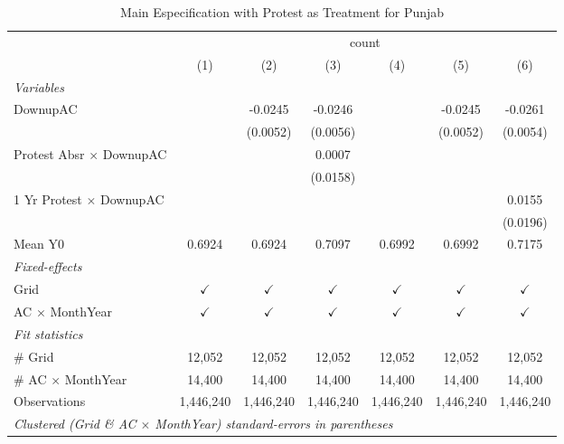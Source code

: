 
\begin{table}[htbp]
   \caption{\label{tab:protest_treat_main_pj} Main Especification with Protest as Treatment for Punjab}
   \centering
   \begin{tabular}{lcccccc}
      \tabularnewline \midrule \midrule
       & \multicolumn{6}{c}{count}\\
                                       & (1)           & (2)           & (3)           & (4)           & (5)           & (6)\\  
      \midrule
      \emph{Variables}\\
      DownupAC                         &               & -0.0245       & -0.0246       &               & -0.0245       & -0.0261\\   
                                       &               & (0.0052)      & (0.0056)      &               & (0.0052)      & (0.0054)\\   
      Protest Absr $\times$ DownupAC   &               &               & 0.0007        &               &               &   \\   
                                       &               &               & (0.0158)      &               &               &   \\   
      1 Yr Protest $\times$ DownupAC   &               &               &               &               &               & 0.0155\\   
                                       &               &               &               &               &               & (0.0196)\\   
      Mean Y0                          & 0.6924        & 0.6924        & 0.7097        & 0.6992        & 0.6992        & 0.7175\\  
      \midrule
      \emph{Fixed-effects}\\
      Grid                             & $\checkmark$  & $\checkmark$  & $\checkmark$  & $\checkmark$  & $\checkmark$  & $\checkmark$\\   
      AC $\times$ MonthYear            & $\checkmark$  & $\checkmark$  & $\checkmark$  & $\checkmark$  & $\checkmark$  & $\checkmark$\\   
      \midrule
      \emph{Fit statistics}\\
      \# Grid                          & 12,052        & 12,052        & 12,052        & 12,052        & 12,052        & 12,052\\  
      \# AC $\times$ MonthYear         & 14,400        & 14,400        & 14,400        & 14,400        & 14,400        & 14,400\\  
      Observations                     & 1,446,240     & 1,446,240     & 1,446,240     & 1,446,240     & 1,446,240     & 1,446,240\\  
      \midrule \midrule
      \multicolumn{7}{l}{\emph{Clustered (Grid \& AC $\times$ MonthYear) standard-errors in parentheses}}\\
   \end{tabular}
\end{table}


